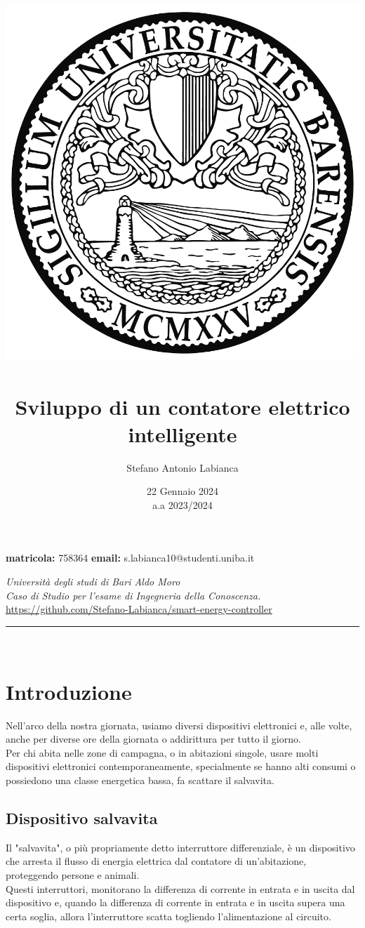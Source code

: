 \documentclass[12pt, letterpaper]{article}
\title{
    \includegraphics[scale=0.5]{unibalogo.jpg}~\\[1cm]
    \textbf{Sviluppo di un contatore elettrico intelligente}
}
\author{Stefano Antonio Labianca}
\date{22 Gennaio 2024 \\[0.125cm] a.a 2023/2024}
\begin{document}
\maketitle


\textbf{matricola: } 758364
\hfill
\textbf{email: } s.labianca10@studenti.uniba.it
\hfill \\
\begin{center}
      \textit{Università degli studi di Bari Aldo Moro} \\
      \textit{Caso di Studio per l'esame di Ingegneria della Conoscenza.} \\[0.25cm]
      \url{https://github.com/Stefano-Labianca/smart-energy-controller}
\end{center}


\par\noindent\rule{\textwidth}{0.4pt}~\\[5cm]

\newpage

\tableofcontents

\newpage

\section{Introduzione}

Nell'arco della nostra giornata, usiamo diversi dispositivi elettronici e,
alle volte, anche per diverse ore della giornata o addirittura per tutto
il giorno. \\ \break
Per chi abita nelle zone di campagna, o in abitazioni singole, usare molti
dispositivi elettronici contemporaneamente, specialmente se hanno alti consumi o
possiedono una classe energetica bassa, fa scattare il salvavita.

\subsection{Dispositivo salvavita}

Il "salvavita", o più propriamente detto interruttore differenziale, è un dispositivo
che arresta il flusso di energia elettrica dal contatore di
un'abitazione, proteggendo persone e animali. \\

\noindent Questi interruttori, monitorano la differenza di corrente in entrata
e in uscita dal dispositivo e, quando la differenza di corrente in entrata e in
uscita supera una certa soglia, allora l'interruttore scatta togliendo l'alimentazione
al circuito.
\end{document}
